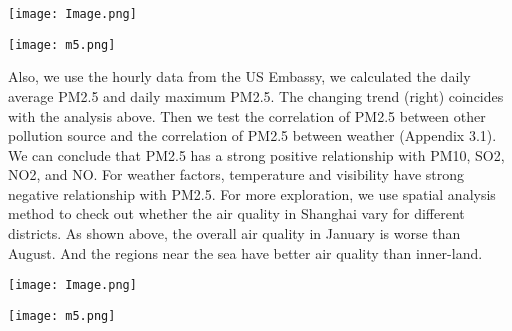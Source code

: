 \documentclass[11pt,]{article}
\begin{document}
\begin{minipage}{.45\linewidth}
\begin{flushleft}

{\texttt{[image: Image.png]}}

\end{flushleft} 
\end{minipage}
\hfill
\begin{minipage}{.45\linewidth}
\begin{flushright} 

{\texttt{[image: m5.png]}}

\end{flushright} 
\end{minipage}

\vspace{3mm}

Also, we use the hourly data from the US Embassy, we calculated the daily average PM2.5 and daily maximum PM2.5. The changing trend (right) coincides with the analysis above.
Then we test the correlation of PM2.5 between other pollution source and the correlation of PM2.5 between weather (Appendix 3.1). We can conclude that PM2.5 has a strong positive relationship with PM10, SO2, NO2, and NO. For weather factors, temperature and visibility have strong negative relationship with PM2.5.
For more exploration, we use spatial analysis method to check out whether the air quality in Shanghai vary for different districts. As shown above, the overall air quality in January is worse than August. And the regions near the sea have better air quality than inner-land.

\vspace{3mm}

\begin{minipage}{.45\linewidth}
\begin{flushleft}

{\texttt{[image: Image.png]}}

\end{flushleft} 
\end{minipage}
\hfill
\begin{minipage}{.45\linewidth}
\begin{flushright} 

{\texttt{[image: m5.png]}}

\end{flushright} 
\end{minipage}

\vspace{3mm}
\end{document}

